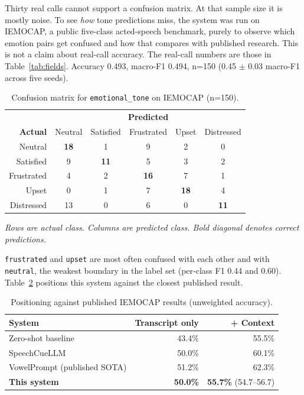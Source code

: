 \documentclass[11pt]{article}
\renewcommand{\arraystretch}{1.05}
\begin{document}
Thirty real calls cannot support a confusion matrix. At that sample size it is mostly noise. To see \emph{how} tone predictions miss, the system was run on IEMOCAP, a public five-class acted-speech benchmark, purely to observe which emotion pairs get confused and how that compares with published research. This is not a claim about real-call accuracy. The real-call numbers are those in Table~\ref{tab:fields}. Accuracy 0.493, macro-F1 0.494, n=150 (0.45 $\pm$ 0.03 macro-F1 across five seeds).

\begin{table}[htbp]
\centering
\caption{Confusion matrix for \texttt{emotional\_tone} on IEMOCAP (n=150).}
\label{tab:cm}
\renewcommand{\arraystretch}{1.05}
\begin{tabular}{r|ccccc}
 & \multicolumn{5}{c}{\textbf{Predicted}} \\
\textbf{Actual} & Neutral & Satisfied & Frustrated & Upset & Distressed \\
\hline
Neutral & \textbf{18} & 1 & 9 & 2 & 0 \\
Satisfied & 9 & \textbf{11} & 5 & 3 & 2 \\
Frustrated & 4 & 2 & \textbf{16} & 7 & 1 \\
Upset & 0 & 1 & 7 & \textbf{18} & 4 \\
Distressed & 13 & 0 & 6 & 0 & \textbf{11} \\
\end{tabular}

{\footnotesize\itshape Rows are actual class. Columns are predicted class. Bold diagonal denotes correct predictions.}
\end{table}

\texttt{frustrated} and \texttt{upset} are most often confused with each other and with \texttt{neutral}, the weakest boundary in the label set (per-class F1 0.44 and 0.60). Table~\ref{tab:published} positions this system against the closest published result.

\begin{table}[htbp]
\centering
\caption{Positioning against published IEMOCAP results (unweighted accuracy).}
\label{tab:published}
\begin{tabular}{@{}l rr@{}}
\toprule
\textbf{System} & \textbf{Transcript only} & \textbf{+ Context} \\
\midrule
Zero-shot baseline & 43.4\% & 55.5\% \\
SpeechCueLLM & 50.0\% & 60.1\% \\
VowelPrompt (published SOTA) & 51.2\% & 62.3\% \\
\textbf{This system} & \textbf{50.0\%} & \textbf{55.7\%} (54.7--56.7) \\
\bottomrule
\end{tabular}
\end{table}
\end{document}
